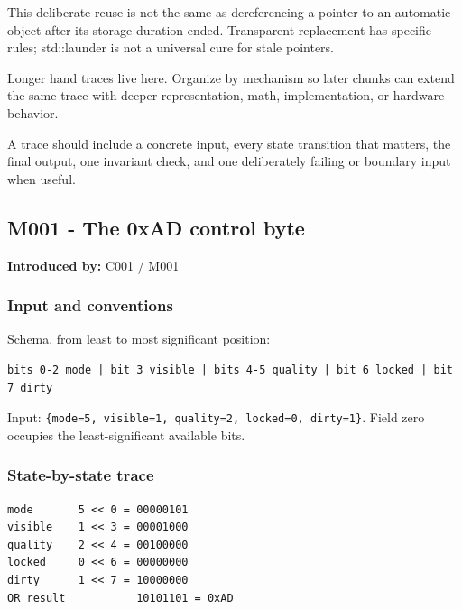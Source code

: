 This deliberate reuse is not the same as dereferencing a pointer to an automatic object after its storage duration ended. Transparent replacement has specific rules; std::launder is not a universal cure for stale pointers.

Longer hand traces live here. Organize by mechanism so later chunks can extend the same trace with deeper representation, math, implementation, or hardware behavior.

A trace should include a concrete input, every state transition that matters, the final output, one invariant check, and one deliberately failing or boundary input when useful.

\subsection{M001 - The 0xAD control byte}\label{appendix-92ff77d4dfdc-m001---the-0xad-control-byte}

\hypertarget{appendix-92ff77d4dfdc-m001---the-0xad-control-byte}{}

\textbf{Introduced by:} \hyperref[01-foundations-i-ch001-from-a-signal-to-an-interpretation]{C001 / M001}

\subsubsection{Input and conventions}\label{appendix-92ff77d4dfdc-input-and-conventions}

\hypertarget{appendix-92ff77d4dfdc-input-and-conventions}{}

Schema, from least to most significant position:

\begin{verbatim}
bits 0-2 mode | bit 3 visible | bits 4-5 quality | bit 6 locked | bit 7 dirty
\end{verbatim}

Input: \texttt{\{mode=5,\ visible=1,\ quality=2,\ locked=0,\ dirty=1\}}. Field zero occupies the least-significant available bits.

\subsubsection{State-by-state trace}\label{appendix-92ff77d4dfdc-state-by-state-trace}

\hypertarget{appendix-92ff77d4dfdc-state-by-state-trace}{}

\begin{verbatim}
mode       5 << 0 = 00000101
visible    1 << 3 = 00001000
quality    2 << 4 = 00100000
locked     0 << 6 = 00000000
dirty      1 << 7 = 10000000
OR result           10101101 = 0xAD
\end{verbatim}

